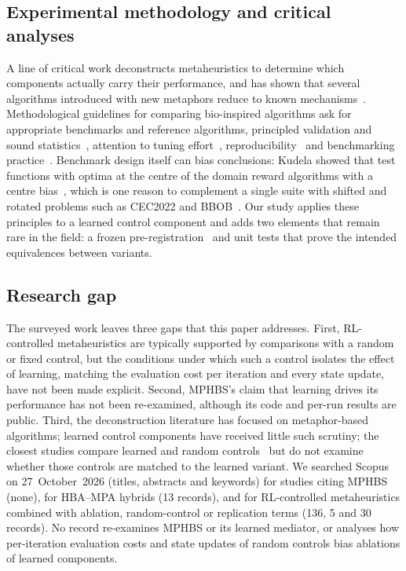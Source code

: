 \documentclass[11pt]{article}
\theoremstyle{definition}
\theoremstyle{remark}
\begin{document}
\subsection{Experimental methodology and critical analyses}
A line of critical work deconstructs metaheuristics to determine which components actually carry their performance, and
has shown that several algorithms introduced with new metaphors reduce to known
mechanisms~\citep{sorensen2015metaphor,camacho2019iwd,camacho2022cuckoo,camacho2023exposing,aranha2022elephant}.
Methodological guidelines for comparing bio-inspired algorithms ask for appropriate benchmarks and reference algorithms,
principled validation and sound statistics~\citep{latorre2021guidelines,derrac2011tutorial}, attention to tuning
effort~\citep{eiben2011tuning}, reproducibility~\citep{lopezibanez2021reproducibility} and benchmarking
practice~\citep{bartzbeielstein2020benchmarking}. Benchmark design itself can bias conclusions: Kudela showed that test
functions with optima at the centre of the domain reward algorithms with a centre bias~\citep{kudela2022centre}, which is one
reason to complement a single suite with shifted and rotated problems such as CEC2022 and BBOB~\citep{hansen2021coco}. Our
study applies these principles to a learned control component and adds two elements that remain rare in the field: a
frozen pre-registration~\citep{nosek2018preregistration} and unit tests that prove the intended equivalences between variants.

\subsection{Research gap}
\label{sec:gap}
The surveyed work leaves three gaps that this paper addresses. First, RL-controlled metaheuristics are typically supported
by comparisons with a random or fixed control, but the conditions under which such a control isolates the effect of
learning, matching the evaluation cost per iteration and every state update, have not been made explicit. Second, MPHBS's
claim that learning drives its performance has not been re-examined, although its code and per-run results are public.
Third, the deconstruction literature has focused on metaphor-based algorithms; learned control components have received
little such scrutiny; the closest studies compare learned and random controls~\citep{hanna2025apr,carrasco2026orchestration}
but do not examine whether those controls are matched to the learned variant. We searched Scopus on 27~October~2026
(titles, abstracts and keywords) for studies citing MPHBS (none), for HBA--MPA hybrids (13 records), and for
RL-controlled metaheuristics combined with ablation, random-control or replication terms (136, 5 and 30 records). No
record re-examines MPHBS or its learned mediator, or analyses how per-iteration evaluation costs and state updates of random
controls bias ablations of learned components.
\end{document}
